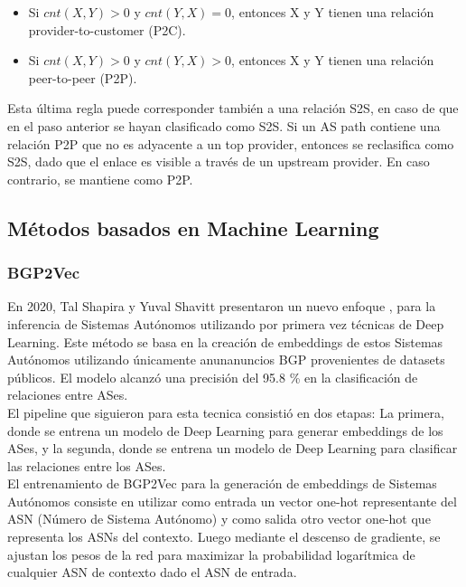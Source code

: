 \begin{enumerate}
    \begin{itemize}
        \item Si $cnt(X, Y) > 0$ y $cnt(Y, X) = 0$, entonces X y Y tienen una relación provider-to-customer (P2C).
        \item Si $cnt(X, Y) > 0$ y $cnt(Y, X) > 0$, entonces X y Y tienen una relación peer-to-peer (P2P).
    \end{itemize}
  Esta última regla puede corresponder también a una relación S2S, en caso de que en el paso anterior se hayan clasificado como S2S. Si un AS path contiene una relación P2P que no es adyacente a un top provider, entonces se reclasifica como S2S, dado que el enlace es visible a través de un upstream provider. En caso contrario, se mantiene como P2P.


\end{enumerate}



\subsection{Métodos basados en Machine Learning} \label{sec:anexo_inferencia_relaciones_as_aprendizaje_automatico}



\subsubsection{BGP2Vec} \label{sec:anexo_bgp2vec}


En 2020, Tal Shapira y Yuval Shavitt presentaron un nuevo enfoque \cite{UnveilingtheTypeRelationshipBetweenAutonomousSystemsUsingDeepLearning}, para la inferencia de Sistemas Autónomos utilizando por primera vez técnicas de Deep Learning. Este método se basa en la creación de embeddings de estos Sistemas Autónomos utilizando únicamente anunanuncios BGP provenientes de datasets públicos.
El modelo alcanzó una precisión del 95.8 \% en la clasificación de relaciones entre ASes.\\

El pipeline que siguieron para esta tecnica consistió en dos etapas: La 
primera, donde se entrena un modelo de Deep Learning para generar embeddings de los ASes, y la segunda, donde se entrena un modelo de Deep Learning para clasificar las relaciones entre los ASes.\\


El entrenamiento de BGP2Vec para la generación de embeddings de Sistemas Autónomos consiste en utilizar como entrada un vector one-hot representante del ASN (Número de Sistema Autónomo) y como salida otro vector one-hot que representa los ASNs del contexto. Luego mediante el descenso de gradiente, se ajustan los pesos de la red para maximizar la probabilidad logarítmica de cualquier ASN de contexto dado el ASN de entrada.\\


